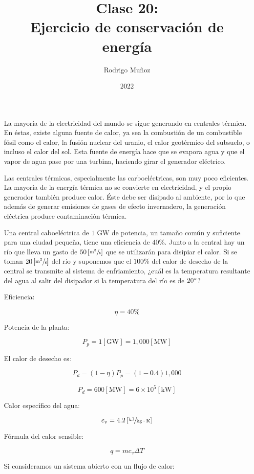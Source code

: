 \documentclass[11pt]{article}
\title{Clase 20: \\ Ejercicio de conservación de energía}
\author{Rodrigo Muñoz}
\date{2022}
\begin{document}
\maketitle

La mayoría de la electricidad del mundo se sigue generando en centrales térmica. En éstas, existe alguna fuente de calor, ya sea la combustión de un combustible fósil como el calor, la fusión nuclear del uranio, el calor geotérmico del subsuelo, o incluso el calor del sol. Esta fuente de energía hace que se evapora agua y que el vapor de agua pase por una turbina, haciendo girar el generador eléctrico.

Las centrales térmicas, especialmente las carboeléctricas, son muy poco eficientes. La mayoría de la energía térmica no se convierte en electricidad, y el propio generador también produce calor. Éste debe ser disipado al ambiente, por lo que además de generar emisiones de gases de efecto invernadero, la generación eléctrica produce contaminación térmica.

Una central caboeléctrica de \( 1 \) GW de potencia, un tamaño común y suficiente para una ciudad pequeña, tiene una eficiencia de \( 40 \% \). Junto a la central hay un río que lleva un gasto de \( 50 \left[ \sfrac{\text{m}^3}{\text{s}} \right] \) que se utilizarán para disipiar el calor. Si se toman \( 20 \left[ \sfrac{\text{m}^3}{\text{s}} \right] \) del río y suponemos que el \( 100 \% \) del calor de desecho de la central se transmite al sistema de enfriamiento, ¿cuál es la temperatura resultante del agua al salir del disipador si la temperatura del río es de \( 20 \degree \)?

Eficiencia:

\[ \eta = 40 \% \]

Potencia de la planta:

\[ P_p = 1 \left[ \text{GW} \right] = 1,000 \left[ \text{MW} \right] \]

El calor de desecho es:

\[ P_d = \left( 1 - \eta \right) P_p = \left( 1 - 0.4 \right) 1,000 \]

\[ P_d = 600 \left[ \text{MW} \right] = 6 \times 10^5 \left[ \text{kW} \right]\]

Calor específico del agua:

\[ c_v = 4.2 \left[ \sfrac{\text{kJ}}{\text{kg} \cdot \text{K}} \right] \]

Fórmula del calor sensible:

\[ q = m c_v \Delta T \]

Si consideramos un sistema abierto con un flujo de calor:
\end{document}

